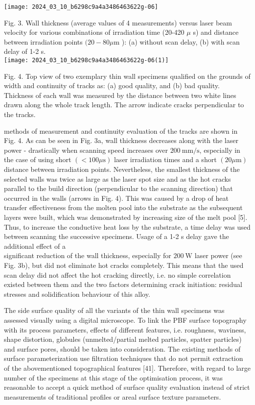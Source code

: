 \documentclass[10pt]{article}
\begin{document}
\begin{center}
\texttt{[image: 2024\_03\_10\_b6298c9a4a3486463622g-06]}
\end{center}

Fig. 3. Wall thickness (average values of 4 measurements) versus laser beam velocity for various combinations of irradiation time (20-420 $\mu$ s) and distance between irradiation points $(20-80 \mu \mathrm{m}$ ): (a) without scan delay, (b) with scan delay of 1-2 s.\\
\texttt{[image: 2024\_03\_10\_b6298c9a4a3486463622g-06(1)]}

Fig. 4. Top view of two exemplary thin wall specimens qualified on the grounds of width and continuity of tracks as: (a) good quality, and (b) bad quality. Thickness of each wall was measured by the distance between two white lines drawn along the whole track length. The arrow indicate cracks perpendicular to the tracks.

methods of measurement and continuity evaluation of the tracks are shown in Fig. 4. As can be seen in Fig. 3a, wall thickness decreases along with the laser power - drastically when scanning speed increases over $200 \mathrm{~mm} / \mathrm{s}$, especially in the case of using short $(<100 \mu \mathrm{s})$ laser irradiation times and a short $(20 \mu \mathrm{m})$ distance between irradiation points. Nevertheless, the smallest thickness of the selected walls was twice as large as the laser spot size and as the hot cracks parallel to the build direction (perpendicular to the scanning direction) that occurred in the walls (arrows in Fig. 4). This was caused by a drop of heat transfer effectiveness from the molten pool into the substrate as the subsequent layers were built, which was demonstrated by increasing size of the melt pool [5]. Thus, to increase the conductive heat loss by the substrate, a time delay was used between scanning the successive specimens. Usage of a 1-2 s delay gave the additional effect of a\\
significant reduction of the wall thickness, especially for $200 \mathrm{~W}$ laser power (see Fig. 3b), but did not eliminate hot cracks completely. This means that the used scan delay did not affect the hot cracking directly, i.e. no simple correlation existed between them and the two factors determining crack initiation: residual stresses and solidification behaviour of this alloy.

The side surface quality of all the variants of the thin wall specimens was assessed visually using a digital microscope. To link the PBF surface topography with its process parameters, effects of different features, i.e. roughness, waviness, shape distortion, globules (unmelted/partial melted particles, spatter particles) and surface pores, should be taken into consideration. The existing methods of surface parameterization use filtration techniques that do not permit extraction of the abovementioned topographical features [41]. Therefore, with regard to large number of the specimens at this stage of the optimisation process, it was reasonable to accept a quick method of surface quality evaluation instead of strict measurements of traditional profiles or areal surface texture parameters.
\end{document}
